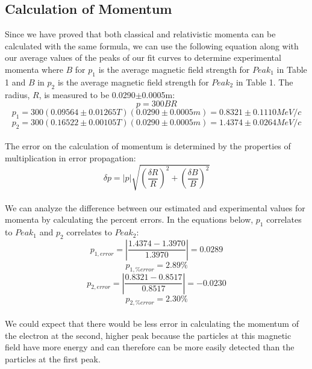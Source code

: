 \subsection{Calculation of Momentum}
Since we have proved that both classical and relativistic momenta can be calculated with the same formula, we can use the following equation along with our average values of the peaks of our fit curves to determine experimental momenta where $B$ for $p_1$ is the average magnetic field strength for $Peak_1$ in Table 1 and $B$ in $p_2$ is the average magnetic field strength for $Peak_2$ in Table 1. The radius, $R$, is measured to be 0.0290$\pm$0.0005m:
\begin{equation} p=300BR\end{equation}
\begin{equation} p_1=300(0.09564\pm0.01265 T)(0.0290\pm 0.0005m)=0.8321\pm0.1110 MeV/c\end{equation}
\begin{equation} p_2=300(0.16522\pm0.00105 T)(0.0290\pm 0.0005m)=1.4374\pm0.0264 MeV/c\end{equation}\\
The error on the calculation of momentum is determined by the properties of multiplication in error propagation:
\begin{equation} \delta p= |p|\sqrt{(\frac{\delta R}{R})^2 + (\frac{\delta B}{B})^2}\end{equation}\\
We can analyze the difference between our estimated and experimental values for momenta by calculating the percent errors. In the equations below, $p_1$ correlates to $Peak_1$ and $p_2$ correlates to $Peak_2$: 
\begin{equation} p_{1,error}=|\frac{1.4374-1.3970}{1.3970}|=0.0289\end{equation}
\begin{equation} p_{1,\% error}= 2.89 \% \end{equation}
\begin{equation} p_{2,error}=|\frac{0.8321-0.8517}{0.8517}|=-0.0230\end{equation}
\begin{equation} p_{2,\% error}= 2.30 \% \end{equation}\\
We could expect that there would be less error in calculating the momentum of the electron at the second, higher peak because the particles at this magnetic field have more energy and can therefore can be more easily detected than the particles at the first peak. 

